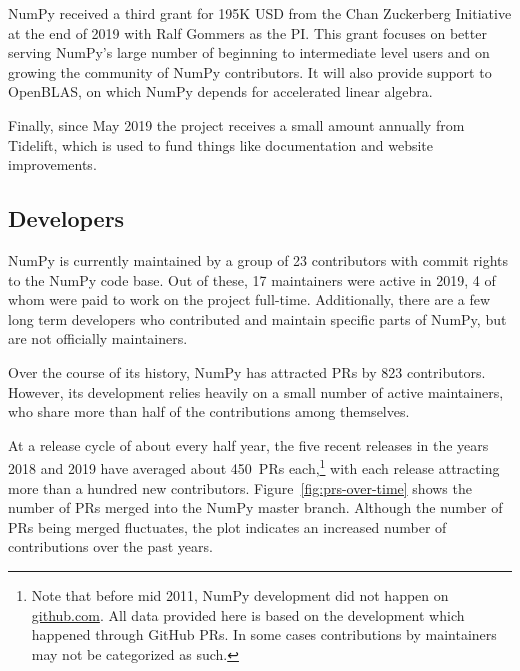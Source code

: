 NumPy received a third grant for 195K USD from the Chan Zuckerberg
Initiative at the end of 2019 with Ralf Gommers as the PI.
This grant focuses on better serving NumPy's large number of beginning
to intermediate level users and on growing the community of NumPy
contributors.
It will also provide support to OpenBLAS, on which NumPy depends for
accelerated linear algebra.

Finally, since May 2019 the project receives a small amount annually from
Tidelift, which is used to fund things like documentation and website
improvements.


\subsection*{Developers}

NumPy is currently maintained by a group of 23 contributors with commit rights
to the NumPy code base. Out of these, 17 maintainers were active in
2019, 4 of whom were paid to work on the project full-time.
Additionally, there are a few long term developers who contributed and maintain
specific parts of NumPy, but are not officially maintainers.

Over the course of its history, NumPy has attracted PRs by 823 contributors.
However, its development relies heavily on a small number
of active maintainers, who share more than half of the contributions among
themselves.

At a release cycle of about every half year, the five recent releases in the years
2018 and 2019 have averaged about 450~PRs each,\footnote{
    Note that before mid 2011, NumPy development did not happen on \url{github.com}.
    All data provided here is based on the development which happened through GitHub
    PRs. In some cases contributions by maintainers may not be categorized as such.}
with each release attracting more than a hundred new contributors.
Figure~\ref{fig:prs-over-time} shows the number of PRs merged into the NumPy
master branch.
Although the number of PRs being merged fluctuates,
the plot indicates an increased number of contributions over the past
years.

